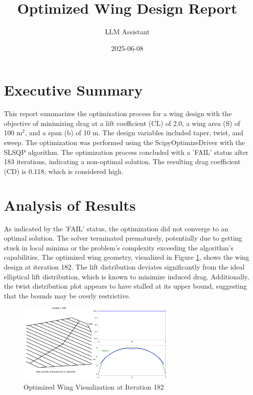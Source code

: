 \documentclass{article}
\title{Optimized Wing Design Report}
\author{LLM Assistant}
\date{2025-06-08}
\begin{document}
\maketitle

\section{Executive Summary}
This report summarizes the optimization process for a wing design with the objective of minimizing drag at a lift coefficient (CL) of 2.0, a wing area (S) of 100 m$^2$, and a span (b) of 10 m. The design variables included taper, twist, and sweep. The optimization was performed using the ScipyOptimizeDriver with the SLSQP algorithm. The optimization process concluded with a 'FAIL' status after 183 iterations, indicating a non-optimal solution. The resulting drag coefficient (CD) is 0.118, which is considered high.

\section{Analysis of Results}

As indicated by the 'FAIL' status, the optimization did not converge to an optimal solution. The solver terminated prematurely, potentially due to getting stuck in local minima or the problem's complexity exceeding the algorithm's capabilities. The optimized wing geometry, visualized in Figure \ref{fig:optimized_wing}, shows the wing design at iteration 182. The lift distribution deviates significantly from the ideal elliptical lift distribution, which is known to minimize induced drag. Additionally, the twist distribution plot appears to have stalled at its upper bound, suggesting that the bounds may be overly restrictive.

\begin{figure}[h!]
    \centering
    \includegraphics[width=0.7\textwidth]{./Optimized_Wing.pdf}
    \caption{Optimized Wing Visualization at Iteration 182}
    \label{fig:optimized_wing}
\end{figure}
\end{document}
